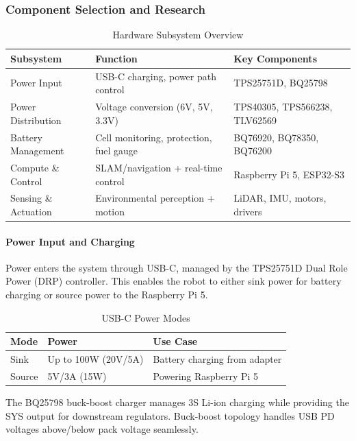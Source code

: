 \subsubsection{Component Selection and Research}

\begin{table}[H]
\centering
\caption{Hardware Subsystem Overview}
\begin{tabular}{@{}lll@{}}
\toprule
\textbf{Subsystem} & \textbf{Function} & \textbf{Key Components} \\
\midrule
Power Input & USB-C charging, power path control & TPS25751D, BQ25798 \\
Power Distribution & Voltage conversion (6V, 5V, 3.3V) & TPS40305, TPS566238, TLV62569 \\
Battery Management & Cell monitoring, protection, fuel gauge & BQ76920, BQ78350, BQ76200 \\
Compute \& Control & SLAM/navigation + real-time control & Raspberry Pi 5, ESP32-S3 \\
Sensing \& Actuation & Environmental perception + motion & LiDAR, IMU, motors, drivers \\
\bottomrule
\end{tabular}
\end{table}

\paragraph{Power Input and Charging}
Power enters the system through USB-C, managed by the TPS25751D Dual Role Power (DRP) controller. This enables the robot to either sink power for battery charging or source power to the Raspberry Pi 5.

\begin{table}[H]
\centering
\caption{USB-C Power Modes}
\begin{tabular}{@{}lll@{}}
\toprule
\textbf{Mode} & \textbf{Power} & \textbf{Use Case} \\
\midrule
Sink & Up to 100W (20V/5A) & Battery charging from adapter \\
Source & 5V/3A (15W) & Powering Raspberry Pi 5 \\
\bottomrule
\end{tabular}
\end{table}

The BQ25798 buck-boost charger manages 3S Li-ion charging while providing the SYS output for downstream regulators. Buck-boost topology handles USB PD voltages above/below pack voltage seamlessly.

